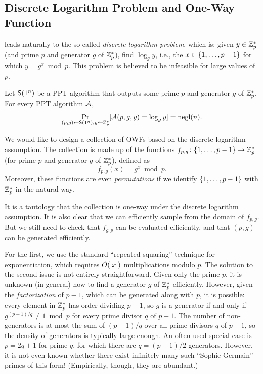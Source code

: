 \documentclass[11pt]{article}
\begin{document}
\subsection{Discrete Logarithm Problem and One-Way Function}
\label{sec:dlp-owf}

 leads naturally to the so-called \emph{discrete logarithm problem}, which is: given $y \in \mathbb{Z}_p^{*}$ (and prime $p$ and generator $g$ of $\mathbb{Z}_p^{*}$), find $\log_{g} y$, i.e., the $x \in \{1, \ldots, p-1\}$ for which $y = g^{x} \bmod p$.
This problem is believed to be infeasible for large values of $p$.

\begin{conjecture}
  Let $\mathsf{S}(1^{n})$ be a PPT algorithm that outputs some prime $p$ and generator $g$ of $\mathbb{Z}_p^{*}$.
  For every PPT algorithm $\mathcal{A}$, \[ \Pr_{(p,g) \gets \mathsf{S}(1^{n}), y \gets \mathbb{Z}_p^{*}} [\mathcal{A}(p,g,y) = \log_{g} y] = \operatorname{negl}(n).
\]
\end{conjecture}

We would like to design a collection of OWFs based on the discrete logarithm assumption.
The collection is made up of the functions $f_{p,g} \colon \{1, \ldots, p-1\} \to \mathbb{Z}_p^{*}$ (for prime $p$ and generator $g$ of $\mathbb{Z}_p^{*}$), defined as
\[ f_{p,g}(x) = g^{x} \bmod p. \] Moreover, these functions are even
\emph{permutations} if we identify $\{1, \ldots, p-1\}$ with
$\mathbb{Z}_p^{*}$ in the natural way.

It is a tautology that the collection is one-way under the discrete logarithm assumption.
It is also clear that we can efficiently sample from the domain of $f_{p,g}$.
But we still need to check that $f_{g,p}$ can be evaluated efficiently, and that $(p,g)$ can be generated efficiently.

For the first, we use the standard ``repeated squaring'' technique for exponentiation, which requires $O(\lvert x\rvert)$ multiplications modulo $p$.
The solution to the second issue is not entirely straightforward.
Given only the prime $p$, it is unknown (in general) how to find a generator $g$ of $\mathbb{Z}_p^{*}$ efficiently.
However, given the \emph{factorization} of $p-1$, which can be generated along with $p$, it is possible: every element in $\mathbb{Z}_p^{*}$ has order dividing $p-1$, so $g$ is a generator if and only if $g^{(p-1)/q} \neq 1 \bmod p$ for every prime divisor $q$ of $p-1$.
The number of non-generators is at most the sum of $(p-1)/q$ over all prime divisors $q$ of $p-1$, so the density of generators is typically large enough.
An often-used special case is $p = 2q+1$ for prime $q$, for which there are $q = (p-1)/2$ generators.
However, it is not even known whether there exist infinitely many such ``Sophie Germain'' primes of this form!
(Empirically, though, they are abundant.)
\end{document}
